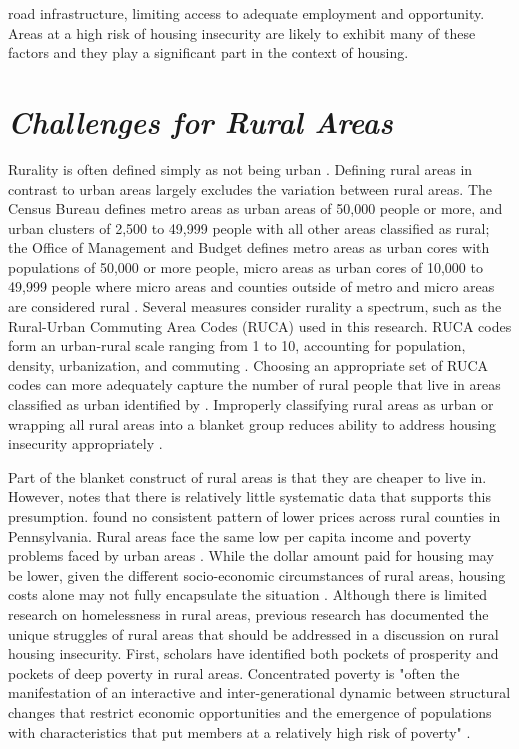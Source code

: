 road infrastructure, limiting access to adequate employment and opportunity. Areas at a high risk of housing insecurity are likely to exhibit many of these factors and they play a significant part in the context of housing.  


 

\section{\textit{Challenges for Rural Areas}}  

 

Rurality is often defined simply as not being urban \citep{robertson_rural_2007}. Defining rural areas in contrast to urban areas largely excludes the variation between rural areas. The Census Bureau defines metro areas as urban areas of 50,000 people or more, and urban clusters of 2,500 to 49,999 people with all other areas classified as rural; the Office of Management and Budget defines metro areas as urban cores with populations of 50,000 or more people, micro areas as urban cores of 10,000 to 49,999 people where micro areas and counties outside of metro and micro areas are considered rural \citep{health_resources__services_administration_defining_2022}. Several measures consider rurality a spectrum, such as the Rural-Urban Commuting Area Codes (RUCA) used in this research. RUCA codes form an urban-rural scale ranging from 1 to 10, accounting for population, density, urbanization, and commuting \citep{usda_economic_research_service_rural-urban_2023}. Choosing an appropriate set of RUCA codes can more adequately capture the number of rural people that live in areas classified as urban identified by \citet{isserman_national_2005}. Improperly classifying rural areas as urban or wrapping all rural areas into a blanket group reduces ability to address housing insecurity appropriately \citep{yousey_defining_2018}.  

 

Part of the blanket construct of rural areas is that they are cheaper to live in. However, \citet{kurre_is_2003} notes that there is relatively little systematic data that supports this presumption. \citet{zimmerman_does_2008} found no consistent pattern of lower prices across rural counties in Pennsylvania. Rural areas face the same low per capita income and poverty problems faced by urban areas \citep{castle_place_2011}. While the dollar amount paid for housing may be lower, given the different socio-economic circumstances of rural areas, housing costs alone may not fully encapsulate the situation \citep{kropczynski_insights_2012}. Although there is limited research on homelessness in rural areas, previous research has documented the unique struggles of rural areas that should be addressed in a discussion on rural housing insecurity. First, scholars have identified both pockets of prosperity and pockets of deep poverty in rural areas. Concentrated poverty is "often the manifestation of an interactive and inter-generational dynamic between structural changes that restrict economic opportunities and the emergence of populations with characteristics that put members at a relatively high risk of poverty" \citep[7]{thiede_spatial_2018}.  

